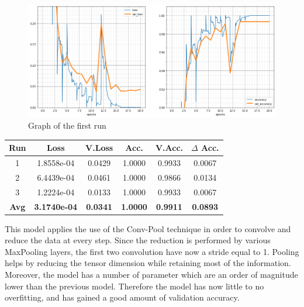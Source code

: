 \begin{figure}[H]
	\begin{center}
	\includegraphics[width=\linewidth]{Immagini/conv-pool-1}
	\caption{Graph of the first run}
	\end{center}
\end{figure}
\begin{table}[H]
	\centering
	\begin{tabular}{cccccc}
		\textbf{Run} &\textbf{Loss}&\textbf{V.Loss} &\textbf{Acc.}&\textbf{V.Acc.}&\textbf{$\Delta$ Acc.} \\ \hline
		1   & 1.8558e-04 &  0.0429  & 1.0000    & 0.9933    & 0.0067\\
		2   & 6.4439e-04 &  0.0461  & 1.0000    & 0.9866    & 0.0134\\
		3   & 1.2224e-04 &  0.0133  & 1.0000    & 0.9933    & 0.0067\\
		\textbf{Avg} & \textbf{3.1740e-04} &  \textbf{0.0341}  & \textbf{1.0000}    & \textbf{0.9911}    & \textbf{0.0893}
	\end{tabular}
\end{table}

This model applies the use of the Conv-Pool technique in order to convolve and reduce the data at every step. Since the reduction is performed by various MaxPooling layers, the first two convolution have now a stride equal to 1. Pooling helps by reducing the tensor dimension while retaining most of the information. 
Moreover, the model has a number of parameter which are an order of magnitude lower than the previous model. Therefore the model has now little to no overfitting, and has gained a good amount of validation accuracy.